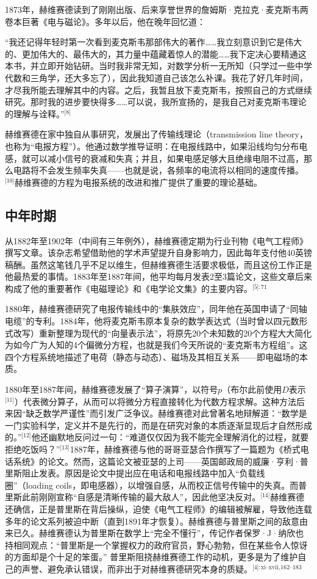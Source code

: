 1873年，赫维赛德读到了刚刚出版、后来享誉世界的詹姆斯·克拉克·麦克斯韦两卷本巨著《电与磁论》。多年以后，他在晚年回忆道：

“我还记得年轻时第一次看到麦克斯韦那部伟大的著作……我立刻意识到它是伟大的、更加伟大的、最伟大的，其力量中蕴藏着惊人的潜能……我下定决心要精通这本书，并立即开始钻研。当时我非常无知，对数学分析一无所知（只学过一些中学代数和三角学，还大多忘了），因此我知道自己该怎么补课。我花了好几年时间，才尽我所能去理解其中的内容。之后，我暂且放下麦克斯韦，按照自己的方式继续研究。那时我的进步要快得多……可以说，我所宣扬的，是我自己对麦克斯韦理论的理解与诠释。”\(^\text{[8]}\)

赫维赛德在家中独自从事研究，发展出了传输线理论（transmission line theory，也称为“电报方程”）。他通过数学推导证明：在电报线路中，如果沿线均匀分布电感，就可以减小信号的衰减和失真；并且，如果电感足够大且绝缘电阻不过高，那么电路将不会发生频率失真——也就是说，各频率的电流将以相同的速度传播。\(^\text{[10]}\)赫维赛德的方程为电报系统的改进和推广提供了重要的理论基础。
\subsection{中年时期}
从1882年至1902年（中间有三年例外），赫维赛德定期为行业刊物《电气工程师》撰写文章。该杂志希望借助他的学术声望提升自身影响力，因此每年支付他40英镑稿酬。虽然这笔钱几乎不足以维生，但赫维赛德生活要求极低，而且这份工作正是他最热爱的事情。1883年至1887年间，他平均每月发表2至3篇论文，这些文章后来构成了他的重要著作《电磁理论》和《电学论文集》的主要内容。\(^\text{[5]: 71 }\)

1880年，赫维赛德研究了电报传输线中的“集肤效应”，同年他在英国申请了“同轴电缆”的专利。1884年，他将麦克斯韦原本复杂的数学表达式（当时曾以四元数形式改写）重新整理为现代的“向量表示法”，将原先20个未知数的20个方程大大简化为如今广为人知的4个偏微分方程，也就是我们今天所说的“麦克斯韦方程组”。这四个方程系统地描述了电荷（静态与动态）、磁场及其相互关系——即电磁场的本质。

1880年至1887年间，赫维赛德发展了“算子演算”，以符号$p$（布尔此前使用$D$表示\(^\text{[11]}\)）代表微分算子，从而可以将微分方程直接转化为代数方程求解。这种方法后来因“缺乏数学严谨性”而引发广泛争议。赫维赛德对此曾著名地辩解道：“数学是一门实验科学，定义并不是先行的，而是在研究对象的本质逐渐显现后才自然形成的。”\(^\text{[12]}\)他还幽默地反问过一句：“难道仅仅因为我不能完全理解消化的过程，就要拒绝吃饭吗？”\(^\text{[13]}\)1887年，赫维赛德与他的哥哥亚瑟合作撰写了一篇题为《桥式电话系统》的论文。然而，这篇论文被亚瑟的上司——英国邮政局的威廉·亨利·普里斯阻止发表。原因是论文中提出应在电话和电报线路中加入“负载线圈”（loading coils，即电感器），以增强自感，从而校正信号传输中的失真。而普里斯此前刚刚宣称“自感是清晰传输的最大敌人”，因此他坚决反对。\(^\text{[14]}\)赫维赛德还确信，正是普里斯在背后操纵，迫使《电气工程师》的编辑被解雇，导致他连载多年的论文系列被迫中断（直到1891年才恢复）。赫维赛德与普里斯之间的敌意由来已久。赫维赛德认为普里斯在数学上“完全不懂行”，传记作者保罗·J·纳欣也持相同观点：“普里斯是一个掌握权力的政府官员，野心勃勃，但在某些令人惊讶的方面却是个十足的笨蛋。” 普里斯阻挠赫维赛德工作的动机，更多是为了维护自己的声誉、避免承认错误，而非出于对赫维赛德研究本身的质疑。\(^\text{[4]: xi–xvii, 162–183 }\)

